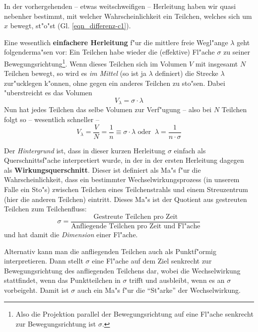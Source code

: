 In der vorhergehenden -- etwas weitschweifigen -- Herleitung haben wir
quasi nebenher bestimmt, mit welcher Wahrscheinlichkeit ein Teilchen,
welches sich um $x$ bewegt, st"o"st (Gl. \eqref{eqn_differenz-c1}).

Eine wesentlich \textbf{einfachere Herleitung} f"ur die mittlere freie
Wegl"ange $\lambda$ geht folgenderma"sen vor: Ein Teilchen habe wieder
die (effektive) Fl"ache $\sigma$ zu seiner
Bewegungsrichtung\footnote{Also die Projektion parallel der
  Bewegungsrichtung auf eine Fl"ache senkrecht zur Bewegungsrichtung
  ist $\sigma$.}. Wenn dieses Teilchen sich im Volumen $V$ mit
insgesamt $N$ Teilchen bewegt, so wird es \emph{im Mittel} (so ist ja
$\lambda$ definiert) die Strecke $\lambda$ zur"ucklegen k"onnen, ohne
gegen ein anderes Teilchen zu sto"sen. Dabei "uberstreicht es das
Volumen
\begin{equation*}
   V_{\lambda} = \sigma \cdot \lambda
\end{equation*}
Nun hat jedes Teilchen das selbe Volumen zur Verf"ugung -- also bei $N$
Teilchen folgt so -- wesentlich schneller --
\begin{equation}
   \label{eq:204}
   V_\lambda = \frac{V}{N} = \frac{1}{n} \equiv \sigma \cdot \lambda
   \text{ oder } ~ \lambda = \frac{1}{n \cdot \sigma}
\end{equation}


\abs Der \emph{Hintergrund} ist, dass in dieser kurzen Herleitung
$\sigma$ einfach als Querschnittsf"ache interpretiert wurde, in der in
der ersten Herleitung dagegen als
\textbf{Wirkungsquerschnitt}. Dieser ist
definiert als Ma"s f"ur die Wahrscheinlichkeit, dass ein bestimmter
Wechselwirkungsprozess (in unserem Falle ein Sto"s) zwischen Teilchen
eines Teilchenstrahls und einem Streuzentrum (hier die anderen
Teilchen) eintritt. Dieses Ma"s ist der Quotient aus gestreuten
Teilchen zum Teilchenfluss:
\begin{equation*}
   \sigma = \frac{\text{Gestreute Teilchen pro
       Zeit}}{\text{Anfliegende Teilchen pro Zeit und Fl"ache}}
\end{equation*}
und hat damit die \emph{Dimension} einer Fl"ache.

Alternativ kann man die anfliegenden Teilchen auch als Punktf"ormig
interpretieren. Dann stellt $\sigma$ eine Fl"ache auf dem Ziel
senkrecht zur Bewegungsrichtung des anfliegenden Teilchens dar, wobei
die Wechselwirkung stattfindet, wenn das Punktteilchen in $\sigma$
trifft und ausbleibt, wenn es an $\sigma$ vorbeigeht. Damit ist
$\sigma$ auch ein Ma"s f"ur die "`St"arke"' der Wechselwirkung. 

